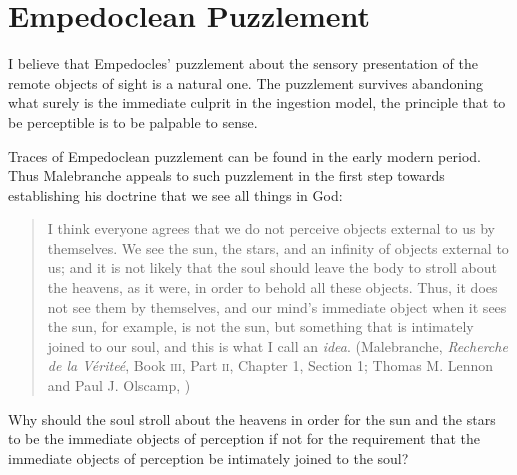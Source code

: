 
\section{Empedoclean Puzzlement} %
\label{sec:empedoclean_puzzlement}

I believe that Empedocles' puzzlement about the sensory presentation of the remote objects of sight is a natural one. The puzzlement survives abandoning what surely is the immediate culprit in the ingestion model, the principle that to be perceptible is to be palpable to sense.

Traces of Empedoclean puzzlement can be found in the early modern period. Thus Malebranche appeals to such puzzlement in the first step towards establishing his doctrine that we see all things in God:
\begin{quote}
	I think everyone agrees that we do not perceive objects external to us by themselves. We see the sun, the stars, and an infinity of objects external to us; and it is not likely that the soul should leave the body to stroll about the heavens, as it were, in order to behold all these objects. Thus, it does not see them by themselves, and our mind's immediate object when it sees the sun, for example, is not the sun, but something that is intimately joined to our soul, and this is what I call an \emph{idea}. (Malebranche, \emph{Recherche de la V\'{e}rite\'{e}}, Book \textsc{iii}, Part \textsc{ii}, Chapter 1, Section 1; Thomas M. Lennon and Paul J. Olscamp, \citeyear[217]{Malebranche:1997sf})
\end{quote}
Why should the soul stroll about the heavens in order for the sun and the stars to be the immediate objects of perception if not for the requirement that the immediate objects of perception be intimately joined to the soul?


